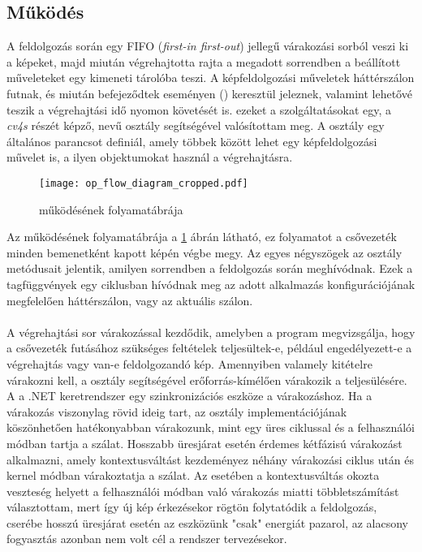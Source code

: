 \subsection{Működés} \label{ssection:mukodes} A feldolgozás során egy FIFO (\textit{first-in first-out}) jellegű várakozási sorból veszi ki a képeket, majd miután végrehajtotta rajta a megadott sorrendben a beállított műveleteket egy kimeneti tárolóba teszi. A képfeldolgozási műveletek háttérszálon futnak, és miután befejeződtek eseményen () keresztül jeleznek, valamint lehetővé teszik a végrehajtási idő nyomon követését is. ezeket a szolgáltatásokat egy, a \emph{cv4s} részét képző,  nevű osztály segítségével valósítottam meg. A  osztály egy általános parancsot definiál, amely többek között lehet egy képfeldolgozási művelet is, a  ilyen objektumokat használ a végrehajtásra.

\begin{figure}[h]
\vspace{.5cm}
\texttt{[image: op\_flow\_diagram\_cropped.pdf]}
\centering
\vspace{.2cm}
\caption{ működésének folyamatábrája}
\label{fig:op_flow_diagram}
\vspace{.5cm}
\end{figure}

Az  működésének folyamatábrája a \ref{fig:op_flow_diagram} ábrán látható, ez folyamatot a csővezeték minden bemenetként kapott képén végbe megy. Az egyes négyszögek az osztály metódusait jelentik, amilyen sorrendben a feldolgozás során meghívódnak. Ezek a tagfüggvények egy ciklusban hívódnak meg az adott alkalmazás konfigurációjának megfelelően háttérszálon, vagy az aktuális szálon.

\paragraph{} A végrehajtási sor várakozással kezdődik, amelyben a program megvizsgálja, hogy a csővezeték futásához szükséges feltételek teljesültek-e, például engedélyezett-e a végrehajtás vagy van-e feldolgozandó kép. Amennyiben valamely kitételre várakozni kell, a  osztály segítségével erőforrás-kímélően várakozik a teljesülésére. A  a .NET keretrendszer egy szinkronizációs eszköze a várakozáshoz. Ha a várakozás viszonylag rövid ideig tart, az osztály implementációjának köszönhetően hatékonyabban várakozunk, mint egy üres  ciklussal és a  felhasználói módban tartja a szálat. Hosszabb üresjárat esetén érdemes kétfázisú várakozást alkalmazni, amely kontextusváltást kezdeményez néhány várakozási ciklus után és kernel módban várakoztatja a szálat. Az  esetében a kontextusváltás okozta veszteség helyett a felhasználói módban való várakozás miatti többletszámítást választottam, mert így új kép érkezésekor rögtön folytatódik a feldolgozás, cserébe hosszú üresjárat esetén az eszközünk "csak" energiát pazarol, az alacsony fogyasztás azonban nem volt cél a rendszer tervezésekor.
